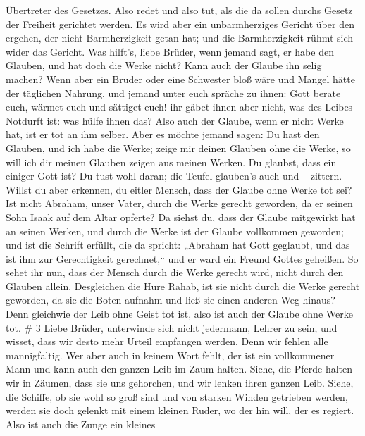 Übertreter des Gesetzes.  Also redet und also tut, als die
da sollen durchs Gesetz der Freiheit gerichtet werden.  Es
wird aber ein unbarmherziges Gericht über den ergehen, der nicht
Barmherzigkeit getan hat; und die Barmherzigkeit rühmt sich wider das
Gericht.  Was hilft's, liebe Brüder, wenn jemand sagt, er
habe den Glauben, und hat doch die Werke nicht? Kann auch der Glaube ihn
selig machen?  Wenn aber ein Bruder oder eine Schwester
bloß wäre und Mangel hätte der täglichen Nahrung,  und
jemand unter euch spräche zu ihnen: Gott berate euch, wärmet euch und
sättiget euch! ihr gäbet ihnen aber nicht, was des Leibes Notdurft ist:
was hülfe ihnen das?  Also auch der Glaube, wenn er nicht
Werke hat, ist er tot an ihm selber.  Aber es möchte jemand
sagen: Du hast den Glauben, und ich habe die Werke; zeige mir deinen
Glauben ohne die Werke, so will ich dir meinen Glauben zeigen aus meinen
Werken.  Du glaubst, dass ein einiger Gott ist? Du tust
wohl daran; die Teufel glauben's auch und -- zittern. 
Willst du aber erkennen, du eitler Mensch, dass der Glaube ohne Werke
tot sei?  Ist nicht Abraham, unser Vater, durch die Werke
gerecht geworden, da er seinen Sohn Isaak auf dem Altar opferte?
 Da siehst du, dass der Glaube mitgewirkt hat an seinen
Werken, und durch die Werke ist der Glaube vollkommen geworden;
 und ist die Schrift erfüllt, die da spricht: „Abraham hat
Gott geglaubt, und das ist ihm zur Gerechtigkeit gerechnet,`` und er
ward ein Freund Gottes geheißen.  So sehet ihr nun, dass
der Mensch durch die Werke gerecht wird, nicht durch den Glauben allein.
 Desgleichen die Hure Rahab, ist sie nicht durch die Werke
gerecht geworden, da sie die Boten aufnahm und ließ sie einen anderen
Weg hinaus?  Denn gleichwie der Leib ohne Geist tot ist,
also ist auch der Glaube ohne Werke tot. \# 3  Liebe Brüder,
unterwinde sich nicht jedermann, Lehrer zu sein, und wisset, dass wir
desto mehr Urteil empfangen werden.  Denn wir fehlen alle
mannigfaltig. Wer aber auch in keinem Wort fehlt, der ist ein
vollkommener Mann und kann auch den ganzen Leib im Zaum halten.
 Siehe, die Pferde halten wir in Zäumen, dass sie uns
gehorchen, und wir lenken ihren ganzen Leib.  Siehe, die
Schiffe, ob sie wohl so groß sind und von starken Winden getrieben
werden, werden sie doch gelenkt mit einem kleinen Ruder, wo der hin
will, der es regiert.  Also ist auch die Zunge ein kleines
